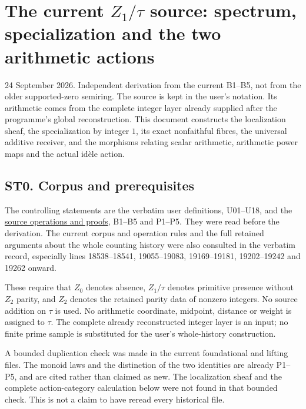 \section{\texorpdfstring{The current \(Z_1/\tau\) source: spectrum,
specialization and the two arithmetic
actions}{The current Z\_1/\textbackslash tau source: spectrum, specialization and the two arithmetic actions}}\label{the-current-z_1tau-source-spectrum-specialization-and-the-two-arithmetic-actions}

24 September 2026. Independent derivation from the current B1--B5, not
from the older supported-zero semiring. The source is kept in the user's
notation. Its arithmetic comes from the complete integer layer already
supplied after the programme's global reconstruction. This document
constructs the localization sheaf, the specialization by integer \(1\),
its exact nonfaithful fibres, the universal additive receiver, and the
morphisms relating scalar arithmetic, arithmetic power maps and the
actual idèle action.

\subsection{ST0. Corpus and
prerequisites}\label{st0.-corpus-and-prerequisites}

The controlling statements are the
{verbatim
user definitions}, U01--U18, and the
\href{../foundations/user_definitions_20260924/SOURCE_OPERATIONS_AND_PROOFS.md}{source
operations and proofs}, B1--B5 and P1--P5. They were read before the
derivation. The current {corpus and
operation rules} and the full retained arguments about the whole
counting history were also consulted in the
{verbatim record}, especially
lines 18538--18541, 19055--19083, 19169--19181, 19202--19242 and 19262
onward.

These require that \(Z_0\) denotes absence, \(Z_1/\tau\) denotes
primitive presence without \(Z_2\) parity, and \(Z_2\) denotes the
retained parity data of nonzero integers. No source addition on \(\tau\)
is used. No arithmetic coordinate, midpoint, distance or weight is
assigned to \(\tau\). The complete already reconstructed integer layer
is an input; no finite prime sample is substituted for the user's
whole-history construction.

A bounded duplication check was made in the current foundational and
lifting files. The monoid laws and the distinction of the two identities
are already P1--P5, and are cited rather than claimed as new. The
localization sheaf and the complete action-category calculation below
were not found in that bounded check. This is not a claim to have reread
every historical file.

